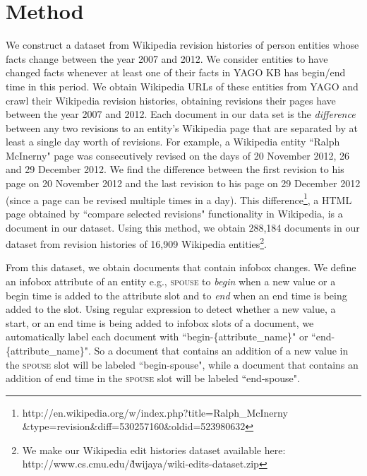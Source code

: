 \section{Method} \label{sec:method}

We construct a dataset from Wikipedia revision histories of person entities whose facts change between the year 2007 and 2012. We consider entities to have changed facts whenever at least one of their facts in YAGO KB \cite{wang2010timely} has begin/end time in this period. We obtain Wikipedia URLs of these entities from YAGO and crawl their Wikipedia revision histories, obtaining revisions their pages have between the year 2007 and 2012. Each document in our data set is the \textit{difference} between any two revisions to an entity's Wikipedia page that are separated by at least a single day worth of revisions. For example, a Wikipedia entity ``Ralph McInerny" page was consecutively revised on the days of 20 November 2012, 26 and 29 December 2012. We find the difference between the first revision to his page on 20 November 2012 and the last revision to his page on 29 December 2012 (since a page can be revised multiple times in a day). This difference\footnote[1]{http://en.wikipedia.org/w/index.php?title=Ralph\_McInerny \&type=revision\&diff=530257160\&oldid=523980632}, a HTML page obtained by ``compare selected revisions"  functionality in Wikipedia, is a document in our dataset. Using this method, we obtain 288,184 documents in our dataset from revision histories of 16,909 Wikipedia entities\footnote[2]{We make our Wikipedia edit histories dataset available here: http://www.cs.cmu.edu/\~dwijaya/wiki-edits-dataset.zip}. 

From this dataset, we obtain documents that contain infobox changes. We define an infobox attribute of an entity e.g., \textsc{spouse} to \textit{begin} when a new value or a begin time is added to the attribute slot and to \textit{end} when an end time is being added to the slot. Using regular expression to detect whether a new value, a start, or an end time is being added to infobox slots of a document, we automatically label each document with ``begin-\{attribute\_name\}" or ``end-\{attribute\_name\}". So a document that contains an addition of a new value in the \textsc{spouse} slot will be labeled ``begin-spouse", while a document that contains an addition of end time in the \textsc{spouse} slot will be labeled ``end-spouse". 



